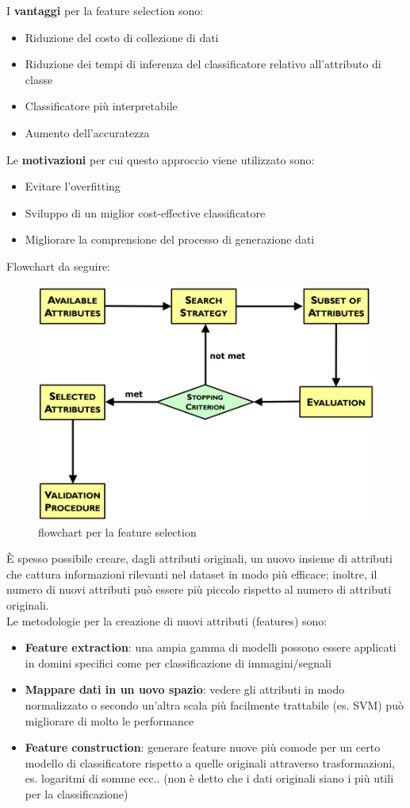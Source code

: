 \noindent
I \textbf{vantaggi} per la feature selection sono:
\begin{itemize}
	\item Riduzione del costo di collezione di dati
	\item Riduzione dei tempi di inferenza del classificatore relativo all'attributo di classe
	\item Classificatore pi\`u interpretabile
	\item Aumento dell'accuratezza
\end{itemize}
Le \textbf{motivazioni} per cui questo approccio viene utilizzato sono:
\begin{itemize}
	\item Evitare l'overfitting
	\item Sviluppo di un miglior cost-effective classificatore
	\item Migliorare la comprensione del processo di generazione dati
\end{itemize}

Flowchart da seguire:
\begin{figure}[H]
	\centering
	\includegraphics[height=0.45 \linewidth]{classification/pict/feature_flowchart.png}
	\caption{flowchart per la feature selection}
\end{figure}

È spesso possibile creare, dagli attributi originali, un nuovo insieme di attributi che cattura informazioni rilevanti nel dataset in modo più efficace; inoltre, il numero di nuovi attributi può essere più piccolo rispetto al numero di attributi originali.\\
Le metodologie per la creazione di nuovi attributi (features) sono:
\begin{itemize}
	\item \textbf{Feature extraction}: una ampia gamma di modelli possono essere applicati in domini specifici come per classificazione di immagini/segnali
	\item \textbf{Mappare dati in un uovo spazio}: vedere gli attributi in modo normalizzato o secondo un'altra scala più facilmente trattabile (es. SVM) può migliorare di molto le performance
	\item \textbf{Feature construction}: generare feature nuove più comode per un certo modello di classificatore rispetto a quelle originali attraverso trasformazioni, es. logaritmi di somme ecc.. (non \`e detto che i dati originali siano i pi\`u utili per la classificazione)
\end{itemize}

